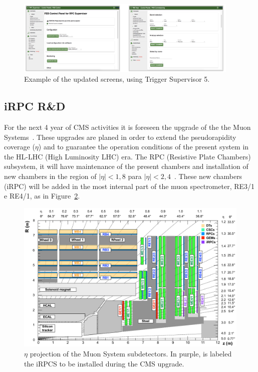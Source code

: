 \begin{figure}[h]
\begin{center}
\includegraphics[width=0.95\textwidth,keepaspectratio]{figures/rpc/ts_view.png}
\end{center}
\caption{Example of the updated screens, using Trigger Supervisor 5.}\label{ts_view}
\end{figure}


\subsection{iRPC R\&D}

For the next 4 year of CMS activities it is foreseen  the upgrade of the the Muon Systems~\cite{muon_tdr}. These upgrades are planed in order to extend the pseudorapidity coverage ($\eta$) and to guarantee the operation conditions of the present system in the HL-LHC (High Luminosity LHC) era. The RPC (Resistive Plate Chambers)~\cite{muon_tdr} subsystem, it will have maintenance of the present chambers and installation of new chambers in the region of $|\eta| < 1,8$ para $|\eta| < 2,4$~\cite{pedrazamorales2018rpc}. These new chambers (iRPC) will be added in the most internal part of the muon spectrometer, RE3/1 e RE4/1, as in Figure~\ref{muons_eta}.

\begin{figure}[h]
\begin{center}
\includegraphics[width=1.0\textwidth,keepaspectratio]{figures/rpc/muon_eta.png}
\end{center}
\caption{$\eta$ projection of the Muon System subdetectors. In purple, is labeled the iRPCS to be installed during the CMS upgrade.}\label{muons_eta}
\end{figure}

